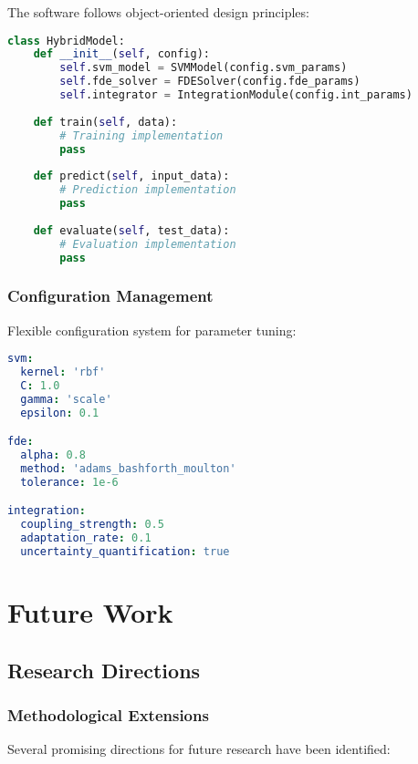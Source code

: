 \documentclass[12pt,a4paper]{report}
\begin{document}
The software follows object-oriented design principles:

\begin{lstlisting}[language=Python, caption=Core Class Structure]
class HybridModel:
    def __init__(self, config):
        self.svm_model = SVMModel(config.svm_params)
        self.fde_solver = FDESolver(config.fde_params)
        self.integrator = IntegrationModule(config.int_params)
    
    def train(self, data):
        # Training implementation
        pass
    
    def predict(self, input_data):
        # Prediction implementation
        pass
    
    def evaluate(self, test_data):
        # Evaluation implementation
        pass
\end{lstlisting}

\subsection{Configuration Management}

Flexible configuration system for parameter tuning:

\begin{lstlisting}[language=YAML, caption=Configuration Example]
svm:
  kernel: 'rbf'
  C: 1.0
  gamma: 'scale'
  epsilon: 0.1

fde:
  alpha: 0.8
  method: 'adams_bashforth_moulton'
  tolerance: 1e-6

integration:
  coupling_strength: 0.5
  adaptation_rate: 0.1
  uncertainty_quantification: true
\end{lstlisting}

\newpage

\chapter{Future Work}

\section{Research Directions}

\subsection{Methodological Extensions}

Several promising directions for future research have been identified:
\end{document}
